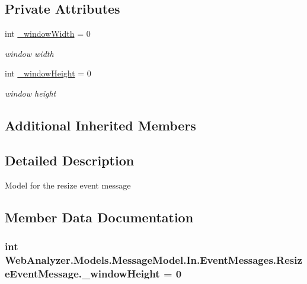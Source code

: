 \subsection*{Private Attributes}
\begin{DoxyCompactItemize}
\item 
int \hyperlink{class_web_analyzer_1_1_models_1_1_message_model_1_1_in_1_1_event_messages_1_1_resize_event_message_a79fea760964664fd139e1f85302b2857}{\+\_\+window\+Width} = 0
\begin{DoxyCompactList}\small\item\em window width \end{DoxyCompactList}\item 
int \hyperlink{class_web_analyzer_1_1_models_1_1_message_model_1_1_in_1_1_event_messages_1_1_resize_event_message_a58970338091e26fc0321e00d6b72528e}{\+\_\+window\+Height} = 0
\begin{DoxyCompactList}\small\item\em window height \end{DoxyCompactList}\end{DoxyCompactItemize}
\subsection*{Additional Inherited Members}


\subsection{Detailed Description}
Model for the resize event message 



\subsection{Member Data Documentation}
\hypertarget{class_web_analyzer_1_1_models_1_1_message_model_1_1_in_1_1_event_messages_1_1_resize_event_message_a58970338091e26fc0321e00d6b72528e}{}
\subsubsection[{\+\_\+window\+Height}]{\setlength{\rightskip}{0pt plus 5cm}int Web\+Analyzer.\+Models.\+Message\+Model.\+In.\+Event\+Messages.\+Resize\+Event\+Message.\+\_\+window\+Height = 0\hspace{0.3cm}{\ttfamily [private]}}\label{class_web_analyzer_1_1_models_1_1_message_model_1_1_in_1_1_event_messages_1_1_resize_event_message_a58970338091e26fc0321e00d6b72528e}


